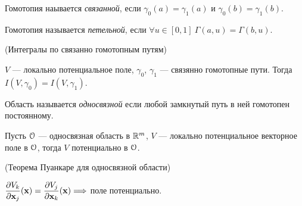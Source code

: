 \begin{definition}
    Гомотопия наывается \textit{связанной}, если $\gamma_0(a) = \gamma_1(a)$ и
    $\gamma_0(b) = \gamma_1(b)$.
\end{definition}

\begin{definition}
    Гомотопия называется \textit{петельной}, если $\forall u \in [0, 1]~
    \Gamma(a, u) = \Gamma(b, u)$.
\end{definition}

\begin{theorem}(Интегралы по связанно гомотопным путям)

    $V$ --- локально потенциальное поле, $\gamma_0$, $\gamma_1$ --- связянно
    гомотопные пути. Тогда $I(V, \gamma_0) = I(V, \gamma_1)$.
\end{theorem}

\begin{definition}
    Область называется \textit{односвязной} если любой замкнутый путь в ней
    гомотопен постоянному.
\end{definition}

\begin{theorem}

    Пусть $\mathcal{O}$ --- односвязная область в $\mathbb{R}^m$, $V$ --- локально потенциальное
    векторное поле в $\mathcal{O}$, тогда $V$ потенциально в $\mathcal{O}$.
\end{theorem}

\begin{corollary}(Теорема Пуанкаре для односвязной области)

    $\dfrac{\partial V_k}{\partial \mathbf{x}_j}(\mathbf{x}) = \dfrac{\partial V_j}{\partial \mathbf{x}_k}(\mathbf{x}) \Longrightarrow$ поле потенциально.
\end{corollary}

